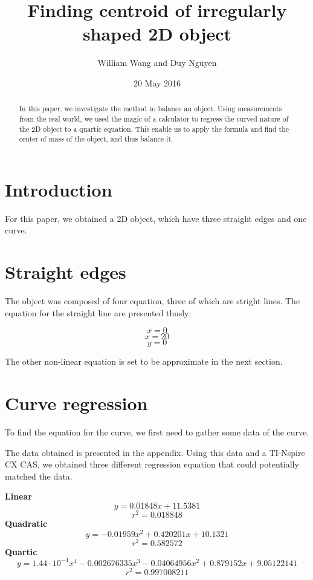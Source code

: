\documentclass{article}
\title{Finding centroid of irregularly shaped 2D object}
\author{William Wang and Duy Nguyen}
\date{20 May 2016}
\begin{document}
\maketitle
\begin{abstract}
    In this paper, we investigate the method to balance an object. Using measurements from the real world, we used the magic of a calculator to regress the curved nature of the 2D object to a quartic equation. This enable us to apply the formula and find the center of mass of the object, and thus balance it. 
\end{abstract}
\section{Introduction}
    For this paper, we obtained a 2D object, which have three straight edges and one curve.
\section{Straight edges}
    The object was composed of four equation, three of which are stright lines. The equation for the straight line are presented thusly:
    
    $$ x = 0 $$
    $$ x = 20 $$
    $$ y = 0 $$
    
    The other non-linear equation is set to be approximate in the next section.
\section{Curve regression}
    To find the equation for the curve, we first need to gather some data of the curve. 
    
    The data obtained is presented in the appendix. Using this data and a TI-Nspire CX CAS, we obtained three different regression equation that could potentially matched the data.
    \begin{center}
    \textbf{Linear}
    $$ y = 0.01848x + 11.5381 $$
    $$ r^2 = 0.018848 $$
    \textbf{Quadratic}
    $$ y = -0.01959x^2 + 0.420201x + 10.1321 $$
    $$ r^2 = 0.582572 $$
    \textbf{Quartic}
    $$ y = 1.44\cdot10^{-4}x^4 - 0.002676335x^3 - 0.04064956x^2 + 0.879152x + 9.05122141$$
    $$ r^2 =  0.997008211 $$
    \end{center}
    
\end{document}
